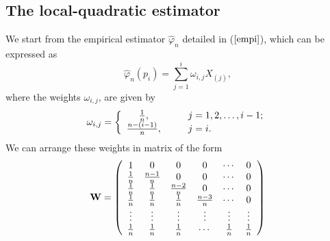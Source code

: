 \documentclass[preprint,12pt]{elsarticle}
\begin{document}
\subsection{The local-quadratic estimator}
\noindent We start from the empirical estimator $\widehat{\varphi}_n$ detailed in ($\ref{empi}$), which can be expressed as
\[
\widehat{\varphi}_n(p_i)=\sum_{j=1}^i\omega_{i,j} X_{(j)},
\] 
where the weights $\omega_{i,j}$, are given by 
\[
\omega_{i,j}=\left\{\begin{array}{cll}
\frac{1}{n}, & \hspace{0.3cm}& j= 1,2, \ldots, i-1; \\
\frac{n-(i-1)}{n},& \hspace{0.3cm}& j= i. \\
\end{array}\right.
\]
We can arrange these weights in matrix of the form
\[
{\bf W} =\left(
\begin{array}{cccccc}
1 & 0 &0 &0& \cdots &0 \\
\frac{1}{n} & \frac{n-1}{n}&0&0&\cdots& 0 \\
\frac{1}{n} & \frac{1}{n}&\frac{n-2}{n}&0&\cdots& 0 \\
\frac{1}{n} & \frac{1}{n}&\frac{1}{n}&\frac{n-3}{n}&\cdots& 0 \\
\vdots&\vdots&\vdots&\vdots&\vdots&\vdots \\
\frac{1}{n} & \frac{1}{n}&\frac{1}{n}&\cdots&\frac{1}{n}& \frac{1}{n} \\
\end{array}
\right)
\]
\end{document}
